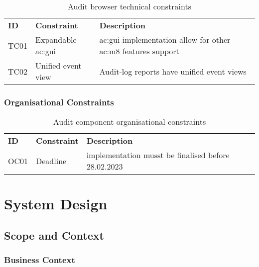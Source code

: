 \begin{table}[H]
  \begin{center}
    \caption{Audit browser technical constraints}
    \label{tab:abtc}
    \def\arraystretch{1.5}
    \begin{tabularx}{\linewidth}{|l l X |}
      \hline
      \rowcolor{gray!20}
      \textbf{ID} & \textbf{Constraint} & \textbf{Description}\\
      TC01 & Expandable \gls{ac:gui} & \gls{ac:gui} implementation allow for other \gls{ac:m8} features support\\
      TC02 & Unified event view & Audit-log reports have unified event views\\
      \hline
    \end{tabularx}
  \end{center}
\end{table}

\subsubsection{Organisational Constraints}

\begin{table}[H]
  \begin{center}
    \caption{Audit component organisational constraints}
    \label{tab:acoc}
    \def\arraystretch{1.5}
    \begin{tabularx}{\linewidth}{|l l X |}
      \hline
      \rowcolor{gray!20}
      \textbf{ID} & \textbf{Constraint} & \textbf{Description}\\
      OC01 & Deadline & implementation musst be finalised before 28.02.2023\\
      \hline
    \end{tabularx}
  \end{center}
\end{table}

\section{System Design}

\subsection{Scope and Context}

\subsubsection{Business Context}

